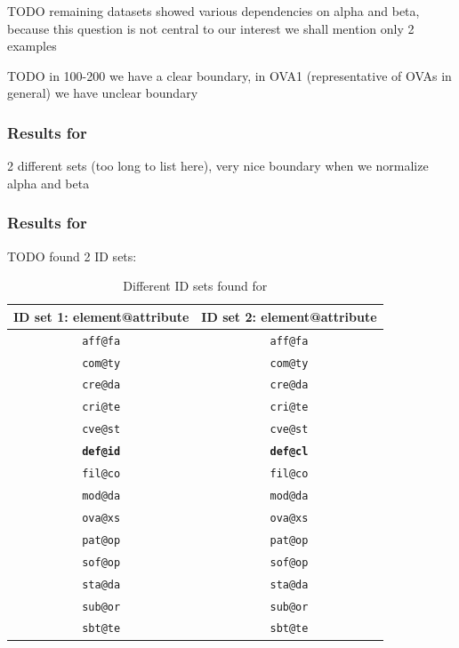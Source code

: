 TODO remaining datasets showed various dependencies on alpha and beta, because this question is not central to our interest we shall mention only 2 examples

TODO in 100-200 we have a clear boundary, in OVA1 (representative of OVAs in general) we have unclear boundary

\subsubsection{Results for }

2 different sets (too long to list here), very nice boundary when we normalize alpha and beta

\subsubsection{Results for }

TODO found 2 ID sets:

\begin{table}
  \caption{Different ID sets found for }
  \bigskip
  \label{table-experiments-various-betas-ova1}
  \centering
  \begin{tabular}{c || c}
    ID set 1: element@attribute & ID set 2: element@attribute \\
    \hline
    \texttt{aff@fa} & \texttt{aff@fa} \\
    \texttt{com@ty} & \texttt{com@ty} \\
    \texttt{cre@da} & \texttt{cre@da} \\
    \texttt{cri@te} & \texttt{cri@te} \\
    \texttt{cve@st} & \texttt{cve@st} \\
    \texttt{\textbf{def@id}} & \texttt{\textbf{def@cl}} \\ %
    \texttt{fil@co} & \texttt{fil@co} \\
    \texttt{mod@da} & \texttt{mod@da} \\
    \texttt{ova@xs} & \texttt{ova@xs} \\
    \texttt{pat@op} & \texttt{pat@op} \\
    \texttt{sof@op} & \texttt{sof@op} \\
    \texttt{sta@da} & \texttt{sta@da} \\
    \texttt{sub@or} & \texttt{sub@or} \\
    \texttt{sbt@te} & \texttt{sbt@te} \\
  \end{tabular}
\end{table}

